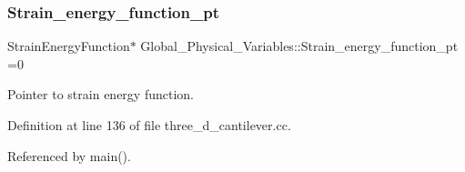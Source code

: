\subsubsection{\texorpdfstring{Strain\+\_\+energy\+\_\+function\+\_\+pt}{Strain\_energy\_function\_pt}}
{\footnotesize\ttfamily Strain\+Energy\+Function$\ast$ Global\+\_\+\+Physical\+\_\+\+Variables\+::\+Strain\+\_\+energy\+\_\+function\+\_\+pt =0}



Pointer to strain energy function. 



Definition at line 136 of file three\+\_\+d\+\_\+cantilever.\+cc.



Referenced by main().

